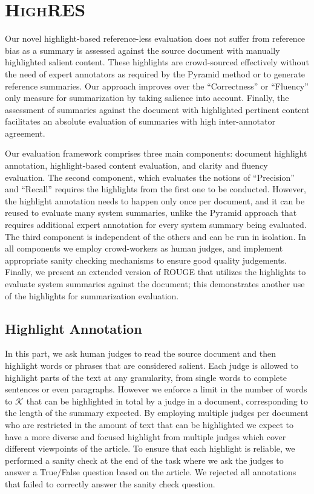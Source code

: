 \documentclass[11pt,a4paper]{article}
\newcommand\highres{\textsc{HighRES}}
\begin{document}
\section{\highres}
\label{sec:highres}

Our novel highlight-based reference-less evaluation does not suffer from reference bias as a summary is assessed against the source document with manually highlighted salient content. These highlights are crowd-sourced effectively without the need of expert annotators as required by the Pyramid method \citep{Nenkova2004a} or to generate reference summaries. Our approach improves over the ``Correctness'' or ``Fluency'' only measure for summarization by taking salience into account. Finally, the assessment of summaries against the document with  highlighted pertinent content facilitates an absolute evaluation of summaries with high inter-annotator agreement. 

Our evaluation framework comprises three main components: document highlight annotation, highlight-based content evaluation, and 
clarity and fluency evaluation. The second component, which evaluates the notions of ``Precision'' and ``Recall'' requires the highlights from the first one to be conducted. However, the highlight annotation needs to happen only once per document, and it can be reused to evaluate many system summaries, unlike the Pyramid approach \citep{Nenkova2004a} that requires additional expert annotation for every system summary being evaluated. The third component is independent of the others and can be run in isolation. In all components we employ crowd-workers as human judges, and implement appropriate sanity checking mechanisms to ensure good quality judgements. Finally, we present an extended version of ROUGE \cite{Lin2004} that utilizes the highlights to evaluate system summaries against the document; this demonstrates another use of the highlights for summarization evaluation. 

\subsection{Highlight Annotation}
\label{subsec:hannot}
In this part, we ask human judges to read the source document and then highlight words or phrases that are considered salient.
Each judge is allowed to highlight parts of the text at any granularity, from single words to complete sentences or even paragraphs. However we enforce a limit in the number of words to $\mathcal{K}$ that can be highlighted in total by a judge in a document, corresponding to the length of the summary expected. By employing multiple judges per document who are restricted in the amount of text that can be highlighted  we expect to have a more diverse and focused highlight from multiple judges which cover different viewpoints of the article. To ensure that each highlight is reliable, we performed a sanity check at the end of the task where we ask the judges to answer a True/False question based on the article. We rejected all annotations that failed to correctly answer the sanity check question. 
\end{document}
